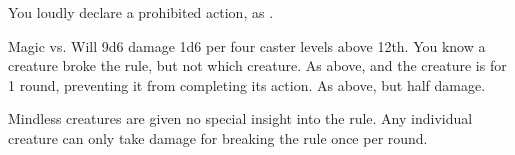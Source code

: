 \begin{spellheader}
\end{spellheader}
\begin{spellcontent}
    \spelleffect You loudly declare a prohibited action, as .
    \spelldur{\durshort}
\end{spellcontent}
\begin{spellsubcontent}
    \begin{spelltargetinginfo}
    \end{spelltargetinginfo}
    \begin{spelleffects}
        \begin{spellattack}{Magic vs. Will}
            \spellsuccess 9d6 damage \add 1d6 per four caster levels above 12th. You know a creature broke the rule, but not which creature.
            \spellcritical As above, and the creature is \stunned for 1 round, preventing it from completing its action.
            \spellfailure As above, but half damage.
        \end{spellattack}
    \end{spelleffects}
\end{spellsubcontent}
\begin{spellfooter}
    \spellnotes Mindless creatures are given no special insight into the rule. Any individual creature can only take damage for breaking the rule once per round.
\end{spellfooter}

